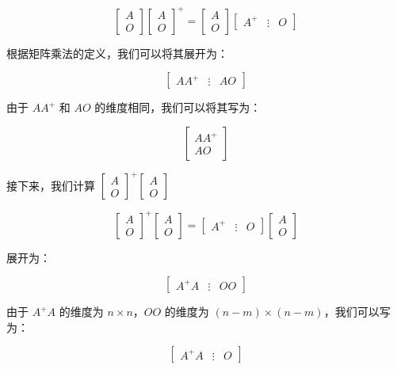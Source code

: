\documentclass[11pt,letterpaper]{ctexart}
\begin{document}
\begin{enumerate}
$$\begin{bmatrix} A \\ O \end{bmatrix} \begin{bmatrix} A \\ O \end{bmatrix}^+ = \begin{bmatrix} A \\ O \end{bmatrix} \begin{bmatrix} A^+ & \vdots & O \end{bmatrix}$$

根据矩阵乘法的定义，我们可以将其展开为：

$$\begin{bmatrix} A A^+ & \vdots & A O \end{bmatrix}$$

由于 $AA^+$ 和 $AO$ 的维度相同，我们可以将其写为：

$$\begin{bmatrix} A A^+ \\ A O \end{bmatrix}$$

接下来，我们计算 $\begin{bmatrix} A \\ O \end{bmatrix}^+ \begin{bmatrix} A \\ O \end{bmatrix}$

$$\begin{bmatrix} A \\ O \end{bmatrix}^+ \begin{bmatrix} A \\ O \end{bmatrix} = \begin{bmatrix} A^+ & \vdots & O \end{bmatrix} \begin{bmatrix} A \\ O \end{bmatrix}$$

展开为：

$$\begin{bmatrix} A^+ A & \vdots & O O \end{bmatrix}$$

由于 $A^+A$ 的维度为 $n \times n$，$OO$ 的维度为 $(n-m) \times (n-m)$，我们可以写为：

$$\begin{bmatrix} A^+ A & \vdots & O \end{bmatrix}$$


\end{enumerate}
\end{document}
